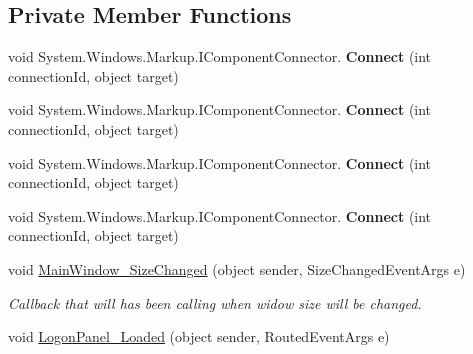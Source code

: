 \subsection*{Private Member Functions}
\begin{DoxyCompactItemize}
\item 
\mbox{\label{class_wpf_handler_1_1_u_i_1_1_controls_1_1_logon_1_1_registration_panel_abe43d5c4cbe12784e4da3d78df3ff1c1}} 
void System.\+Windows.\+Markup.\+I\+Component\+Connector. {\bfseries Connect} (int connection\+Id, object target)
\item 
\mbox{\label{class_wpf_handler_1_1_u_i_1_1_controls_1_1_logon_1_1_registration_panel_abe43d5c4cbe12784e4da3d78df3ff1c1}} 
void System.\+Windows.\+Markup.\+I\+Component\+Connector. {\bfseries Connect} (int connection\+Id, object target)
\item 
\mbox{\label{class_wpf_handler_1_1_u_i_1_1_controls_1_1_logon_1_1_registration_panel_abe43d5c4cbe12784e4da3d78df3ff1c1}} 
void System.\+Windows.\+Markup.\+I\+Component\+Connector. {\bfseries Connect} (int connection\+Id, object target)
\item 
\mbox{\label{class_wpf_handler_1_1_u_i_1_1_controls_1_1_logon_1_1_registration_panel_abe43d5c4cbe12784e4da3d78df3ff1c1}} 
void System.\+Windows.\+Markup.\+I\+Component\+Connector. {\bfseries Connect} (int connection\+Id, object target)
\item 
void \mbox{\hyperlink{class_wpf_handler_1_1_u_i_1_1_controls_1_1_logon_1_1_registration_panel_af7dcb01e3a28df3dbf53b5eb2a58b1ac}{Main\+Window\+\_\+\+Size\+Changed}} (object sender, Size\+Changed\+Event\+Args e)
\begin{DoxyCompactList}\small\item\em Callback that will has been calling when widow size will be changed. \end{DoxyCompactList}\item 
void \mbox{\hyperlink{class_wpf_handler_1_1_u_i_1_1_controls_1_1_logon_1_1_registration_panel_a4ee6df9a19b36e88c71e85fdc295a806}{Logon\+Panel\+\_\+\+Loaded}} (object sender, Routed\+Event\+Args e)

\end{DoxyCompactItemize}
